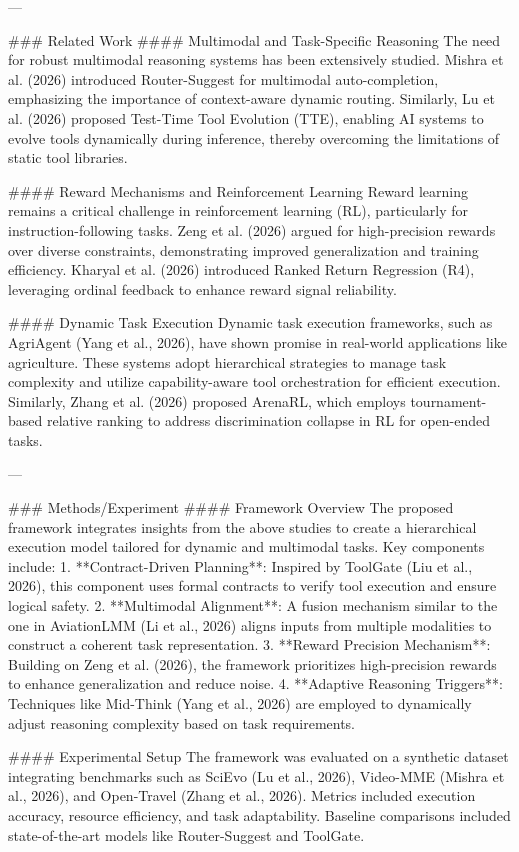 ---

### Related Work
#### Multimodal and Task-Specific Reasoning
The need for robust multimodal reasoning systems has been extensively studied. Mishra et al. (2026) introduced Router-Suggest for multimodal auto-completion, emphasizing the importance of context-aware dynamic routing. Similarly, Lu et al. (2026) proposed Test-Time Tool Evolution (TTE), enabling AI systems to evolve tools dynamically during inference, thereby overcoming the limitations of static tool libraries.

#### Reward Mechanisms and Reinforcement Learning
Reward learning remains a critical challenge in reinforcement learning (RL), particularly for instruction-following tasks. Zeng et al. (2026) argued for high-precision rewards over diverse constraints, demonstrating improved generalization and training efficiency. Kharyal et al. (2026) introduced Ranked Return Regression (R4), leveraging ordinal feedback to enhance reward signal reliability.

#### Dynamic Task Execution
Dynamic task execution frameworks, such as AgriAgent (Yang et al., 2026), have shown promise in real-world applications like agriculture. These systems adopt hierarchical strategies to manage task complexity and utilize capability-aware tool orchestration for efficient execution. Similarly, Zhang et al. (2026) proposed ArenaRL, which employs tournament-based relative ranking to address discrimination collapse in RL for open-ended tasks.

---

### Methods/Experiment
#### Framework Overview
The proposed framework integrates insights from the above studies to create a hierarchical execution model tailored for dynamic and multimodal tasks. Key components include:
1. **Contract-Driven Planning**: Inspired by ToolGate (Liu et al., 2026), this component uses formal contracts to verify tool execution and ensure logical safety.
2. **Multimodal Alignment**: A fusion mechanism similar to the one in AviationLMM (Li et al., 2026) aligns inputs from multiple modalities to construct a coherent task representation.
3. **Reward Precision Mechanism**: Building on Zeng et al. (2026), the framework prioritizes high-precision rewards to enhance generalization and reduce noise.
4. **Adaptive Reasoning Triggers**: Techniques like Mid-Think (Yang et al., 2026) are employed to dynamically adjust reasoning complexity based on task requirements.

#### Experimental Setup
The framework was evaluated on a synthetic dataset integrating benchmarks such as SciEvo (Lu et al., 2026), Video-MME (Mishra et al., 2026), and Open-Travel (Zhang et al., 2026). Metrics included execution accuracy, resource efficiency, and task adaptability. Baseline comparisons included state-of-the-art models like Router-Suggest and ToolGate.

